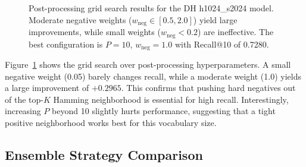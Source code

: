 \documentclass[11pt,a4paper]{article}
\begin{document}
\begin{figure}[htbp]
\centering
{}
\caption{Post-processing grid search results for the DH h1024\_s2024 model. Moderate negative weights ($w_{\text{neg}} \in [0.5, 2.0]$) yield large improvements, while small weights ($w_{\text{neg}} < 0.2$) are ineffective. The best configuration is $P=10$, $w_{\text{neg}}=1.0$ with Recall@10 of 0.7280.}
\label{fig:postprocess}
\end{figure}

Figure~\ref{fig:postprocess} shows the grid search over post-processing hyperparameters. A small negative weight (0.05) barely changes recall, while a moderate weight (1.0) yields a large improvement of $+0.2965$. This confirms that pushing hard negatives out of the top-$K$ Hamming neighborhood is essential for high recall. Interestingly, increasing $P$ beyond 10 slightly hurts performance, suggesting that a tight positive neighborhood works best for this vocabulary size.

\subsection{Ensemble Strategy Comparison}
\end{document}
